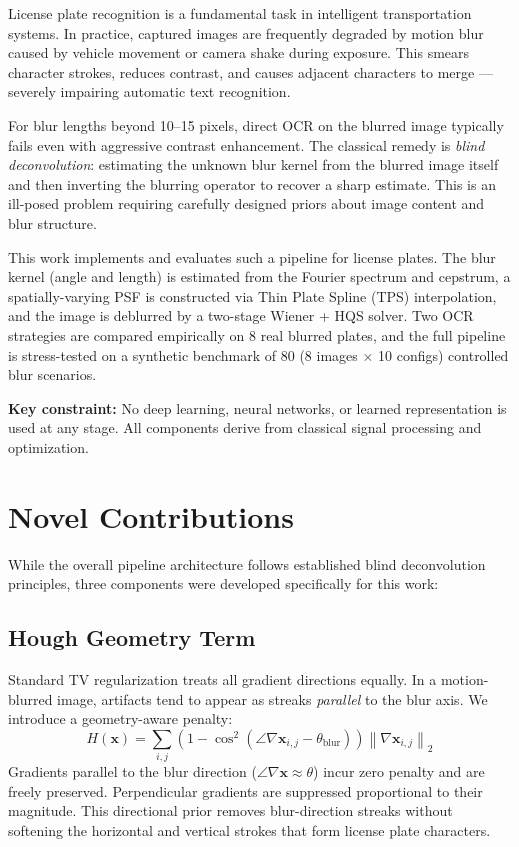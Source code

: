 \documentclass[12pt,a4paper]{article}
\newcommand{\norm}[1]{\left\lVert#1\right\rVert}
\begin{document}
License plate recognition is a fundamental task in intelligent transportation systems.
In practice, captured images are frequently degraded by motion blur caused by vehicle
movement or camera shake during exposure. This smears character strokes, reduces contrast,
and causes adjacent characters to merge --- severely impairing automatic text recognition.

For blur lengths beyond 10--15 pixels, direct OCR on the blurred image typically fails even
with aggressive contrast enhancement. The classical remedy is \emph{blind deconvolution}:
estimating the unknown blur kernel from the blurred image itself and then inverting the
blurring operator to recover a sharp estimate. This is an ill-posed problem requiring
carefully designed priors about image content and blur structure.

This work implements and evaluates such a pipeline for license plates.
The blur kernel (angle and length) is estimated from the Fourier spectrum and cepstrum,
a spatially-varying PSF is constructed via Thin Plate Spline (TPS) interpolation,
and the image is deblurred by a two-stage Wiener + HQS solver. Two OCR strategies are
compared empirically on 8 real blurred plates, and the full pipeline is stress-tested
on a synthetic benchmark of 80 (8 images $\times$ 10 configs) controlled blur scenarios.

\textbf{Key constraint:} No deep learning, neural networks, or learned representation
is used at any stage. All components derive from classical signal processing and optimization.

\section{Novel Contributions}

While the overall pipeline architecture follows established blind deconvolution principles,
three components were developed specifically for this work:

\subsection{Hough Geometry Term}

Standard TV regularization treats all gradient directions equally. In a motion-blurred
image, artifacts tend to appear as streaks \emph{parallel} to the blur axis. We introduce
a geometry-aware penalty:
\begin{equation}
  H(\mathbf{x}) = \sum_{i,j}
    \!\left(1 - \cos^2\!\left(\angle\nabla\mathbf{x}_{i,j} - \theta_{\mathrm{blur}}\right)\right)
    \norm{\nabla\mathbf{x}_{i,j}}_2
  \label{eq:hough_term}
\end{equation}
Gradients parallel to the blur direction ($\angle\nabla\mathbf{x} \approx \theta$) incur
zero penalty and are freely preserved. Perpendicular gradients are suppressed proportional
to their magnitude. This directional prior removes blur-direction streaks without softening
the horizontal and vertical strokes that form license plate characters.
\end{document}
